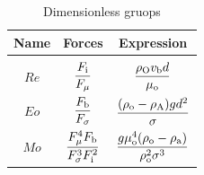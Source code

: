 \lipsum[1-4]
\begin{table}[h]
\begin{center}
\setlength\tabcolsep{10ex}
\begin{tabular}{c c c}
\hline
Name & Forces & Expression\\
\hline \\ [-4mm]
$\displaystyle Re$ & $\displaystyle \frac{F_{\mathrm{i}}}{F_{\mathrm{\mu}}}$  & $\displaystyle \frac{\rho_{\mathrm{O}} v_{\mathrm{b}} d}{\mu_{\mathrm{o}}}$ \\ [2ex]
$\displaystyle Eo$ &  $\displaystyle \frac{F_{\mathrm{b}}}{F_{\mathrm{\sigma}}}$ & $\displaystyle \frac{(\rho_{\mathrm{o}} - \rho_{\mathrm{A}}) g d^2}{\sigma}$ \\[2ex]
$\displaystyle Mo$ & $\displaystyle \frac{F_{\mathrm{\mu}}^4 F_{\mathrm{b}}}{F_{\mathrm{\sigma}}^3 F_{\mathrm{i}}^2 }$ & $\displaystyle \frac{g \mu_{\mathrm{o}}^4 (\rho_{\mathrm{o}} - \rho_{\mathrm{a}})}{\rho_{\mathrm{o}}^2 \sigma^3}$ \\[2ex]
\hline
\end{tabular}
\end{center}
\captionsetup{justification=raggedright,singlelinecheck=false}
\caption{Dimensionless gruops}
\label{tab:tab2}
\end{table}




